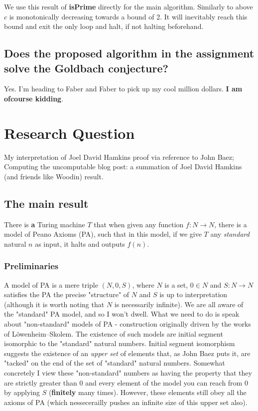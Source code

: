 \documentclass{article}
\begin{document}
We use this result of \textbf{isPrime} directly for the main algorithm. Similarly to above $c$ is monotonically decreasing towards a bound of 2. It will inevitably reach this bound and exit the only loop and halt, if not halting beforehand.

\subsection{Does the proposed algorithm in the assignment solve the Goldbach conjecture?}
Yes. I'm heading to Faber and Faber to pick up my cool million dollars. \textbf{I am ofcourse kidding}.

\pagebreak
\section{Research Question}
My interpretation of Joel David Hamkins proof via reference to John Baez; Computing the uncomputable blog post: a summation of Joel David Hamkins (and friends like Woodin) result.

\subsection{The main result}
There is \textbf{a} Turing machine $T$ that when given any function $f: N \rightarrow N$, there is a model of Peano Axioms (PA), such that in this model, if we give $T$ any \emph{standard} natural $n$ as input, it halts and outputs $f(n)$.

\subsubsection{Preliminaries}
A model of PA is a mere triple $(N, 0, S)$, where $N$ is a set, $0 \in N$ and $S: N \rightarrow N$ satisfies the PA the precise "structure" of $N$ and $S$ is up to interpretation (although it is worth noting that $N$ is necessarily infinite). We are all aware of the "standard" PA model, and so I won't dwell. What we need to do is speak about "non-standard" models of PA - construction originally driven by the works of Löwenheim–Skolem. The existence of such models are initial segment isomorphic to the "standard" natural numbers. Initial segment isomorphism suggests the existence of an \emph{upper set} of elements that, as John Baez puts it, are "tacked" on the end of the set of "standard" natural numbers. Somewhat concretely I view these "non-standard" numbers as having the property that they are strictly greater than $0$ and every element of the model you can reach from 0 by applying $S$ (\textbf{finitely} many times). However, these elements still obey all the axioms of PA (which nessecerailly pushes an infinite size of this upper set also).
\end{document}

